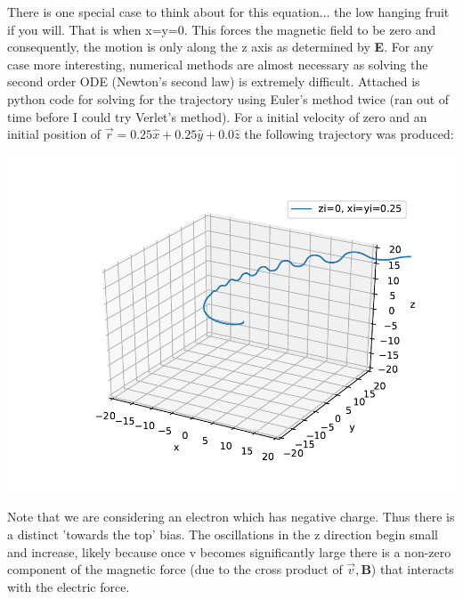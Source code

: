 \documentclass[a4paper, 11pt]{article}
\begin{document}
\noindent There is one special case to think about for this equation... the low hanging fruit if you will. That is when x=y=0. This forces the magnetic field to be zero and consequently, the motion is only along the z axis as determined by \textbf{E}. For any case more interesting, numerical methods are almost necessary as solving the second order ODE (Newton's second law) is extremely difficult. Attached is python code for solving for the trajectory using Euler's method twice (ran out of time before I could try Verlet's method). For a initial velocity of zero and an initial position of $\vec{r} = 0.25\hat{x} + 0.25\hat{y} + 0.0\hat{z}$ the following trajectory was produced: 
	\begin{center}
		\includegraphics[scale=1.0]{trajectory}
	\end{center}
Note that we are considering an electron which has negative charge. Thus there is a distinct 'towards the top' bias. The oscillations in the z direction begin small and increase, likely because once v becomes significantly large there is a non-zero component of the magnetic force (due to the cross product of $\vec{v}, \mathbf{B}$) that interacts with the electric force. 
\end{document}
